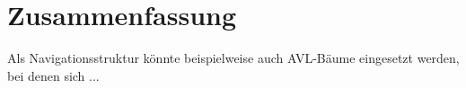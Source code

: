 \chapter{Zusammenfassung}

 Als Navigationsstruktur könnte beispielweise auch AVL-Bäume eingesetzt werden, bei denen sich ...

\Blindtext
